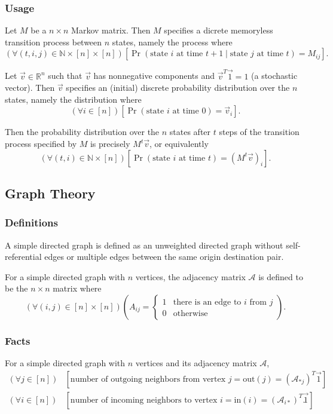 \documentclass[12pt, titlepage, twoside]{amsart}
\newcommand{\R}{\ensuremath{\mathbb R}}
\newcommand{\N}{\ensuremath{\mathbb N}}
\begin{document}
\subsubsection{Usage}

Let $M$ be a $n\times n$ Markov matrix.
Then $M$ specifies a dicrete memoryless transition process between $n$ states, namely the process where
\[
  \left(\forall (t, i, j)\in\N\times[n]\times[n]\right)
  \left[\Pr(\text{state }i\text{ at time }t + 1\mid \text{state }j\text{ at time }t) = M_{ij}\right].
\]

Let $\vec{v}\in\R^n$ such that $\vec{v}$ has nonnegative components and $\vec{v}^T\vec{1} = 1$ (a stochastic vector).
Then $\vec{v}$ specifies an (initial) discrete probability distribution over the $n$ states, namely the distribution where
\[
  (\forall i\in[n])
  [\Pr(\text{state }i\text{ at time }0) = \vec{v}_i].
\]

Then the probability distribution over the $n$ states after $t$ steps of the transition process specified by $M$ is precisely $M^t\vec{v}$,
or equivalently
\[
  (\forall (t, i)\in\N\times[n])
  \left[\Pr(\text{state }i\text{ at time }t) = \left(M^t\vec{v}\right)_i\right].
\]

\subsection{Graph Theory}

\subsubsection{Definitions}

A simple directed graph is defined as an unweighted directed graph without self-referential edges or multiple edges
between the same origin destination pair.

For a simple directed graph with $n$ vertices, the adjacency matrix $\mathcal{A}$ is defined to be
the $n\times n$ matrix where
\[
  (\forall (i, j)\in[n]\times[n])\left(A_{ij} = 
    \begin{cases}
      1 & \text{there is an edge to $i$ from $j$} \\
      0 & \text{otherwise}
    \end{cases}
  \right).
\]

\subsubsection{Facts}

For a simple directed graph with $n$ vertices and its adjacency matrix $\mathcal{A}$,
\begin{align*}
  (\forall j\in[n])&
  \left[\text{number of outgoing neighbors from vertex $j$} = \mathrm{out}(j) = (\mathcal{A}_{*j})^T\vec{1}\right] \\
  (\forall i\in[n])&
  \left[\text{number of incoming neighbors to vertex $i$} = \mathrm{in}(i) = (\mathcal{A}_{i*})^T\vec{1}\right].
\end{align*}
\end{document}
